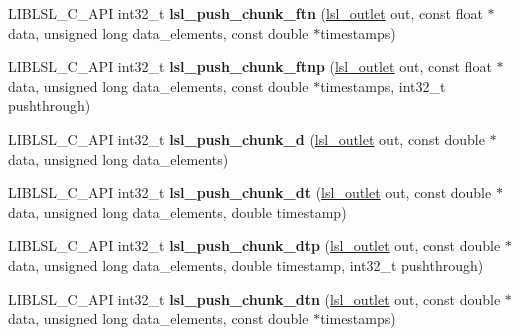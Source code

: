 \begin{DoxyCompactItemize}
\item 
\mbox{\label{namespacelsl_aee7313f1b6a8c88e7bdfc5f133986aaa}} 
L\+I\+B\+L\+S\+L\+\_\+\+C\+\_\+\+A\+PI int32\+\_\+t {\bfseries lsl\+\_\+push\+\_\+chunk\+\_\+ftn} (\hyperlink{namespacelsl_abcf512b0f66dacf86c10b165995fd50b}{lsl\+\_\+outlet} out, const float $\ast$data, unsigned long data\+\_\+elements, const double $\ast$timestamps)
\item 
\mbox{\label{namespacelsl_a5bb763124a2b2e74423b5c382a600b30}} 
L\+I\+B\+L\+S\+L\+\_\+\+C\+\_\+\+A\+PI int32\+\_\+t {\bfseries lsl\+\_\+push\+\_\+chunk\+\_\+ftnp} (\hyperlink{namespacelsl_abcf512b0f66dacf86c10b165995fd50b}{lsl\+\_\+outlet} out, const float $\ast$data, unsigned long data\+\_\+elements, const double $\ast$timestamps, int32\+\_\+t pushthrough)
\item 
\mbox{\label{namespacelsl_aba0e49750a9d56a0058b4287652043b1}} 
L\+I\+B\+L\+S\+L\+\_\+\+C\+\_\+\+A\+PI int32\+\_\+t {\bfseries lsl\+\_\+push\+\_\+chunk\+\_\+d} (\hyperlink{namespacelsl_abcf512b0f66dacf86c10b165995fd50b}{lsl\+\_\+outlet} out, const double $\ast$data, unsigned long data\+\_\+elements)
\item 
\mbox{\label{namespacelsl_ae0c9d5ce50a5e9c7cd612063b82c7e6b}} 
L\+I\+B\+L\+S\+L\+\_\+\+C\+\_\+\+A\+PI int32\+\_\+t {\bfseries lsl\+\_\+push\+\_\+chunk\+\_\+dt} (\hyperlink{namespacelsl_abcf512b0f66dacf86c10b165995fd50b}{lsl\+\_\+outlet} out, const double $\ast$data, unsigned long data\+\_\+elements, double timestamp)
\item 
\mbox{\label{namespacelsl_afdd8325060d14312cb340bc2edcac10a}} 
L\+I\+B\+L\+S\+L\+\_\+\+C\+\_\+\+A\+PI int32\+\_\+t {\bfseries lsl\+\_\+push\+\_\+chunk\+\_\+dtp} (\hyperlink{namespacelsl_abcf512b0f66dacf86c10b165995fd50b}{lsl\+\_\+outlet} out, const double $\ast$data, unsigned long data\+\_\+elements, double timestamp, int32\+\_\+t pushthrough)
\item 
\mbox{\label{namespacelsl_ae0a8ffad75240ca3d702944ebf7d7d53}} 
L\+I\+B\+L\+S\+L\+\_\+\+C\+\_\+\+A\+PI int32\+\_\+t {\bfseries lsl\+\_\+push\+\_\+chunk\+\_\+dtn} (\hyperlink{namespacelsl_abcf512b0f66dacf86c10b165995fd50b}{lsl\+\_\+outlet} out, const double $\ast$data, unsigned long data\+\_\+elements, const double $\ast$timestamps)

\end{DoxyCompactItemize}
